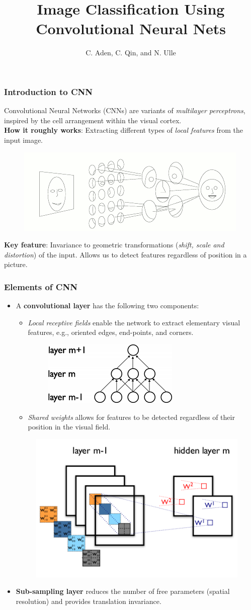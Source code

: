 \documentclass{beamer}
\title[Subtitle]{Image Classification Using Convolutional Neural Nets}
\author{C. Aden, C. Qin, and N. Ulle}
\institute[]{University of California, Davis \medskip}
\date{}
\begin{document}
\begin{frame}
\titlepage
\end{frame}

\begin{frame}
\frametitle{Introduction to CNN}
Convolutional Neural Networks (CNNs) are variants of \emph{multilayer perceptrons}, inspired by the cell arrangement within the visual cortex. \vspace{0.2cm}\\
\textbf{How it roughly works}: Extracting different types of \emph{local features} from the input image. 
\begin{figure}
\includegraphics[width=0.5\linewidth]{face.jpeg}
\end{figure}
\textbf{Key feature}: Invariance to geometric transformations (\emph{shift, scale and distortion}) of the input. Allows us to detect features regardless of position in a picture.
\end{frame}

\begin{frame}
\frametitle{Elements of CNN} 
\begin{itemize} 
\item A \textbf{convolutional layer} has the following two components:
\begin{itemize}
\item \emph{Local receptive fields} enable the network to extract elementary visual features, e.g., oriented edges, end-points, and corners.
\begin{figure}
\includegraphics[width=0.3\linewidth]{sparse.jpeg}
\end{figure}
\item \emph{Shared weights} allows for features to be detected regardless of their position in the visual field.
\end{itemize}
\begin{figure}
\includegraphics[width=0.35\linewidth]{weight.jpeg}
\end{figure}
\item \textbf{Sub-sampling layer} reduces the number of free parameters (spatial resolution) and provides translation invariance.
\end{itemize}
\end{frame}
\end{document}
